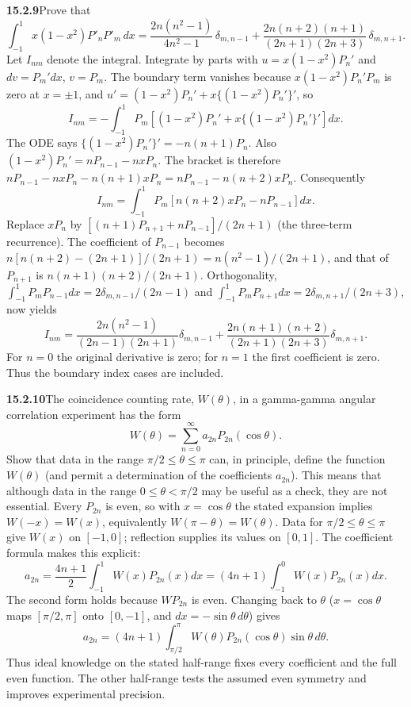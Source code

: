 \par\bigskip
\noindent\textbf{15.2.9}\quad Prove that
\[
\int_{-1}^{1}x(1-x^{2})P'_{n}P'_{m}\,dx
=\frac{2n(n^{2}-1)}{4n^{2}-1}\,\delta_{m,n-1}
+\frac{2n(n+2)(n+1)}{(2n+1)(2n+3)}\,\delta_{m,n+1}.
\]
\solution
Let $I_{nm}$ denote the integral. Integrate by parts with
$u=x(1-x^2)P_n'$ and $dv=P_m'dx$, $v=P_m$. The boundary term vanishes
because $x(1-x^2)P_n'P_m$ is zero at $x=\pm1$, and
$u'=(1-x^2)P_n'+x\{(1-x^2)P_n'\}'$, so
\[
I_{nm}=-\int_{-1}^1P_m
\left[(1-x^2)P_n'+x\{(1-x^2)P_n'\}'\right]dx.
\]
The ODE says $\{(1-x^2)P_n'\}'=-n(n+1)P_n$.
Also $(1-x^2)P_n'=nP_{n-1}-nxP_n$. The bracket is therefore
$nP_{n-1}-nxP_n-n(n+1)xP_n=nP_{n-1}-n(n+2)xP_n$. Consequently
\[
I_{nm}=\int_{-1}^1P_m[n(n+2)xP_n-nP_{n-1}]dx.
\]
Replace $xP_n$ by $[(n+1)P_{n+1}+nP_{n-1}]/(2n+1)$ (the three-term
recurrence). The coefficient of $P_{n-1}$ becomes
$n[n(n+2)-(2n+1)]/(2n+1)=n(n^2-1)/(2n+1)$,
and that of $P_{n+1}$ is $n(n+1)(n+2)/(2n+1)$.
Orthogonality, $\int_{-1}^1P_mP_{n-1}dx=2\delta_{m,n-1}/(2n-1)$ and
$\int_{-1}^1P_mP_{n+1}dx=2\delta_{m,n+1}/(2n+3)$, now yields
\[
\boxed{I_{nm}=\frac{2n(n^2-1)}{(2n-1)(2n+1)}\delta_{m,n-1}
+\frac{2n(n+1)(n+2)}{(2n+1)(2n+3)}\delta_{m,n+1}}.
\]
For $n=0$ the original derivative is zero; for $n=1$ the first
coefficient is zero. Thus the boundary index cases are included.

\par\bigskip
\noindent\textbf{15.2.10}\quad The coincidence counting rate,
$W(\theta)$, in a gamma-gamma angular correlation experiment has the
form
\[
W(\theta)=\sum_{n=0}^{\infty}a_{2n}P_{2n}(\cos\theta).
\]
Show that data in the range $\pi/2\le\theta\le\pi$ can, in principle,
define the function $W(\theta)$ (and permit a determination of the
coefficients $a_{2n}$). This means that although data in the range
$0\le\theta<\pi/2$ may be useful as a check, they are not essential.
\solution
Every $P_{2n}$ is even, so with $x=\cos\theta$ the stated expansion
implies $W(-x)=W(x)$, equivalently $W(\pi-\theta)=W(\theta)$.
Data for $\pi/2\le\theta\le\pi$ give $W(x)$ on $[-1,0]$;
reflection supplies its values on $[0,1]$.
The coefficient formula makes this explicit:
\[
a_{2n}=\frac{4n+1}{2}\int_{-1}^1W(x)P_{2n}(x)dx
=(4n+1)\int_{-1}^0W(x)P_{2n}(x)dx.
\]
The second form holds because $WP_{2n}$ is even.
Changing back to $\theta$ ($x=\cos\theta$ maps $[\pi/2,\pi]$ onto
$[0,-1]$, and $dx=-\sin\theta\,d\theta$) gives
\[
\boxed{a_{2n}=(4n+1)\int_{\pi/2}^{\pi}
W(\theta)P_{2n}(\cos\theta)\sin\theta\,d\theta}.
\]
Thus ideal knowledge on the stated half-range fixes every coefficient
and the full even function. The other half-range tests the assumed
even symmetry and improves experimental precision.

